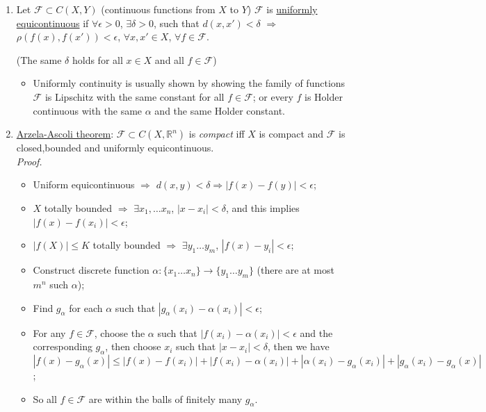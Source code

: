 \documentclass[%
 aip,
 jmp,%
 amsmath,amssymb,
 reprint,%
]{revtex4-1}
\def\R{{\mathbb R}}
\def\a{\alpha}
\def\d{\delta}
\def\e{\epsilon}
\def\r{\rho}
\def\F{{\mathcal F}}
\def\Ra{\Rightarrow}
\renewenvironment{proof}{\color{gray}\footnotesize\emph{Proof.}}{}
\newcommand{\defn}[1]{\underline{#1}}
\begin{document}
\begin{enumerate}
    \item Let $\F \subset C(X,Y)$ (continuous functions from $X$ to $Y$)
    $\F$ is \defn{uniformly equicontinuous}
    if $\forall\e>0$, $\exists\d>0$, such that $d(x,x')<\d$ $\Ra$ $\r(f(x), f(x'))<\e$,
    $\forall x,x' \in X$, $\forall f\in\F$.
    {\footnotesize\color{gray}(The same $\d$ holds for all $x\in X$ and all $f\in\F$)

        \begin{itemize}
            \item Uniformly continuity is usually shown by showing the family of
            functions $\F$ is Lipschitz with the same constant for all $f\in\F$;
            or every $f$ is Holder continuous with the same $\a$ and the same
            Holder constant.
        \end{itemize}
    }
    \item \defn{Arzela-Ascoli theorem}: $\F \subset C(X,\R^n)$ is \emph{compact} iff
    $X$ is compact and $\F$ is closed,bounded and uniformly equicontinuous.\\
    \begin{proof}
        \begin{itemize}
            \item Uniform equicontinuous $\Ra$ $d(x,y)<\d \Ra |f(x)-f(y)|<\e$;
            \item $X$ totally bounded $\Ra$ $\exists x_1, \dots x_n$, $|x-x_i|<\d$,
            and this implies $|f(x) - f(x_i)| < \e$;
            \item $|f(X)|\le K$ totally bounded $\Ra$ $\exists y_1 \dots y_m$,
            $|f(x) - y_i| < \e$;
            \item Construct discrete function $\a: \{x_1 \dots x_n\}\to\{y_1\dots y_m\}$
            (there are at most $m^n$ such $\a$);
            \item Find $g_\a$ for each $\a$ such that $|g_\a(x_i) - \a(x_i)|<\e$;
            \item For any $f\in\F$, choose the $\a$ such that $|f(x_i) - \a(x_i)|<\e$
            and the corresponding $g_\a$, then choose $x_i$ such that $|x-x_i|<\d$,
            then we have $|f(x) - g_\a(x)| \le |f(x) - f(x_i)| + |f(x_i) - \a(x_i)| +
            |\a(x_i) - g_\a(x_i)| + |g_\a(x_i) - g_\a(x)|$;
            \item So all $f\in\F$ are within the balls of finitely many $g_\a$.
        \end{itemize}
    \end{proof}
\end{enumerate}
\end{document}
